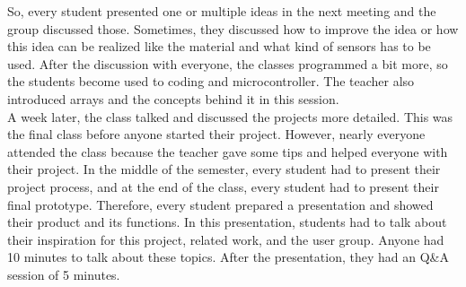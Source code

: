 \documentclass[00_doc.tex]{subfiles}
\begin{document}
\begin{flushleft}
        So, every student presented one or multiple ideas in the next meeting and the 
        group discussed those. Sometimes, they discussed how to improve the idea or how 
        this idea can be realized like the material and what kind of sensors has to be
        used. After the discussion with everyone, the classes programmed a bit more, so 
        the students become used to coding and microcontroller. The teacher also 
        introduced arrays and the concepts behind it in this session. \\

        A week later, the class talked and discussed the projects more detailed. This 
        was the final class before anyone started their project. However, nearly 
        everyone attended the class because the teacher gave some tips and helped 
        everyone with their project. In the middle of the semester, every student had 
        to present their project process, and at the end of the class, every student 
        had to present their final prototype. Therefore, every student prepared a 
        presentation and showed their product and its functions. In this presentation, 
        students had to talk about their inspiration for this project, related work, 
        and the user group. Anyone had 10 minutes to talk about these topics. After the 
        presentation, they had an Q\&A session of 5 minutes.
    \end{flushleft}
\end{document}
